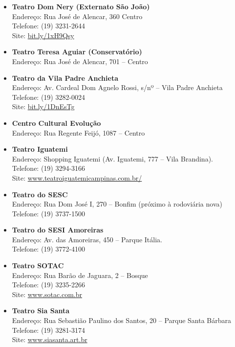 \begin{itemize}
\item \textbf{Teatro Dom Nery (Externato São João)}
  \\Endereço: Rua José de Alencar, 360  Centro
  \\Telefone: (19) 3231-2644
  \\Site: \url{bit.ly/1xH9Qsy}

\item \textbf{Teatro Teresa Aguiar (Conservatório)}
  \\Endereço: Rua José de Alencar, 701 -- Centro

\item \textbf{Teatro da Vila Padre Anchieta}
  \\Endereço: Av. Cardeal Dom Agnelo Rossi, s/nº -- Vila Padre Anchieta
  \\Telefone: (19) 3282-0024
  \\Site: \url{bit.ly/1DnEsTg}

\item \textbf{Centro Cultural Evolução}
  \\Endereço: Rua Regente Feijó, 1087 -- Centro

\item \textbf{Teatro Iguatemi}
  \\Endereço: Shopping Iguatemi (Av. Iguatemi, 777 -- Vila Brandina).
  \\Telefone: (19) 3294-3166
  \\Site: \url{www.teatroiguatemicampinas.com.br/}

\item \textbf{Teatro do SESC}
  \\Endereço: Rua Dom José I, 270 -- Bonfim (próximo à rodoviária nova)
  \\Telefone: (19) 3737-1500

\item \textbf{Teatro do SESI Amoreiras}
  \\Endereço: Av. das Amoreiras, 450 -- Parque Itália.
  \\Telefone: (19) 3772-4100

\item \textbf{Teatro SOTAC}
  \\Endereço: Rua Barão de Jaguara, 2 -- Bosque
  \\Telefone: (19) 3235-2266
  \\Site: \url{www.sotac.com.br}

\item \textbf{Teatro Sia Santa}
  \\Endereço: Rua Sebastião Paulino dos Santos, 20 -- Parque Santa Bárbara
  \\Telefone: (19) 3281-3174
  \\Site: \url{www.siasanta.art.br}
\end{itemize}

